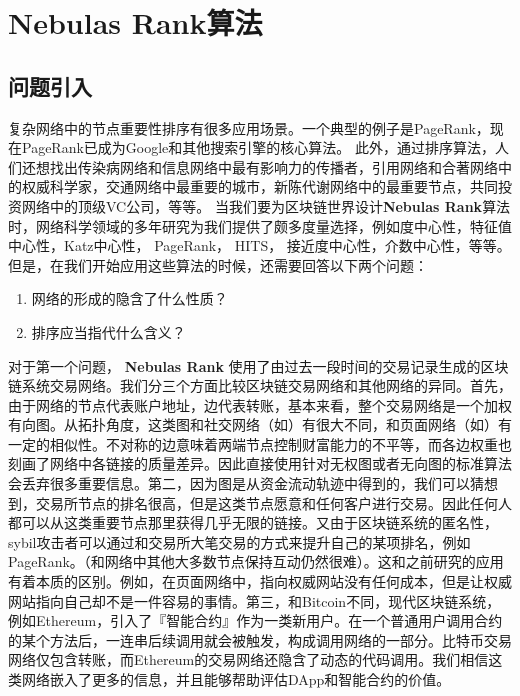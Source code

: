 \section{Nebulas Rank算法}
\label{sec:nrrank}

\subsection{问题引入} \label{sec:intro}
复杂网络中的节点重要性排序有很多应用场景。一个典型的例子是PageRank\cite{Brin2010}\cite{page1999pagerank}，现在PageRank已成为Google和其他搜索引擎的核心算法\cite{langville2011google}。 此外，通过排序算法，人们还想找出传染病网络和信息网络中最有影响力的传播者\cite{doerr2012rumors}\cite{Kitsak2010}，引用网络和合著网络中的权威科学家\cite{walker2007ranking}\cite{chen2007finding}\cite{Radicchi2009}，交通网络中最重要的城市\cite{guimera2005worldwide}，新陈代谢网络中的最重要节点\cite{ivan2010web}，共同投资网络中的顶级VC公司\cite{Bhat2012}，等等。 当我们要为区块链世界设计\textbf{Nebulas Rank}算法时，网络科学领域的多年研究为我们提供了颇多度量选择，例如度中心性\cite{freeman1979set}，特征值中心性\cite{bonacich1972factoring}，Katz中心性\cite{katz1953new}， PageRank\cite{Brin2010}， HITS\cite{kleinberg1999authoritative}， 接近度中心性\cite{sabidussi1966centrality}，介数中心性\cite{freeman1977set}\cite{freeman1978centrality}\cite{freeman1991centrality}\cite{noh2004random}\cite{newman2005measure}，等等。 但是，在我们开始应用这些算法的时候，还需要回答以下两个问题：
\begin{enumerate}
\item 网络的形成的隐含了什么性质？
\item 排序应当指代什么含义？
\end{enumerate}

对于第一个问题， \textbf{Nebulas Rank} 使用了由过去一段时间的交易记录生成的区块链系统交易网络。我们分三个方面比较区块链交易网络和其他网络的异同。首先，由于网络的节点代表账户地址，边代表转账，基本来看，整个交易网络是一个加权有向图。从拓扑角度，这类图和社交网络（如\cite{Ugander2011}）有很大不同，和页面网络（如\cite{page1999pagerank}）有一定的相似性。不对称的边意味着两端节点控制财富能力的不平等，而各边权重也刻画了网络中各链接的质量差异。因此直接使用针对无权图或者无向图的标准算法会丢弃很多重要信息。第二，因为图是从资金流动轨迹中得到的，我们可以猜想到，交易所节点的排名很高，但是这类节点愿意和任何客户进行交易。因此任何人都可以从这类重要节点那里获得几乎无限的链接。又由于区块链系统的匿名性，sybil攻击者可以通过和交易所大笔交易的方式来提升自己的某项排名，例如PageRank。（和网络中其他大多数节点保持互动仍然很难）。这和之前研究的应用有着本质的区别。例如，在页面网络中，指向权威网站没有任何成本，但是让权威网站指向自己却不是一件容易的事情。第三，和Bitcoin\cite{Nakamoto2008}不同，现代区块链系统，例如Ethereum\cite{Wood2014}，引入了『智能合约』作为一类新用户。在一个普通用户调用合约的某个方法后，一连串后续调用就会被触发，构成调用网络的一部分。比特币交易网络仅包含转账，而Ethereum的交易网络还隐含了动态的代码调用。我们相信这类网络嵌入了更多的信息，并且能够帮助评估DApp和智能合约的价值。

